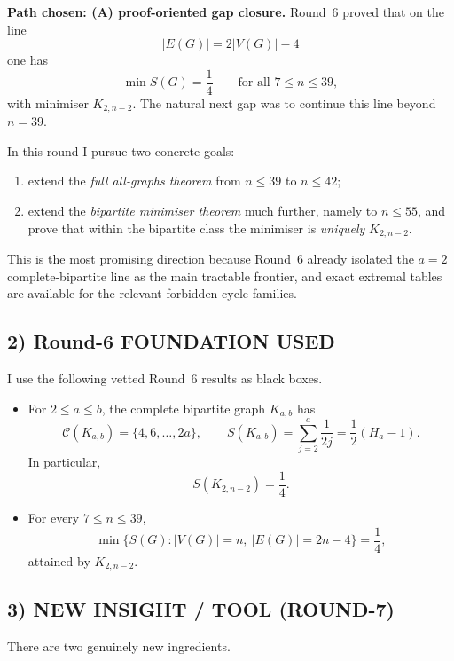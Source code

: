 \textbf{Path chosen: (A) proof-oriented gap closure.}
Round~6 proved that on the line
\[
|E(G)|=2|V(G)|-4
\]
one has
\[
\min S(G)=\frac14
\qquad\text{for all }7\le n\le 39,
\]
with minimiser $K_{2,n-2}$.
The natural next gap was to continue this line beyond $n=39$.

In this round I pursue two concrete goals:
\begin{enumerate}
\item extend the \emph{full all-graphs theorem} from $n\le 39$ to $n\le 42$;
\item extend the \emph{bipartite minimiser theorem} much further, namely to $n\le 55$, and prove that within the bipartite class the minimiser is \emph{uniquely} $K_{2,n-2}$.
\end{enumerate}

This is the most promising direction because Round~6 already isolated the $a=2$ complete-bipartite line as the main tractable frontier, and exact extremal tables are available for the relevant forbidden-cycle families.

\subsection*{2) Round-6 FOUNDATION USED}

I use the following vetted Round~6 results as black boxes.

\begin{itemize}
\item[(F1)] For $2\le a\le b$, the complete bipartite graph $K_{a,b}$ has
\[
\mathcal C(K_{a,b})=\{4,6,\dots,2a\},
\qquad
S(K_{a,b})=\sum_{j=2}^{a}\frac1{2j}=\frac12(H_a-1).
\]
In particular,
\[
S(K_{2,n-2})=\frac14.
\]

\item[(F2)] For every $7\le n\le 39$,
\[
\min\{S(G): |V(G)|=n,\ |E(G)|=2n-4\}=\frac14,
\]
attained by $K_{2,n-2}$.
\end{itemize}

\subsection*{3) NEW INSIGHT / TOOL (ROUND-7)}

There are two genuinely new ingredients.

